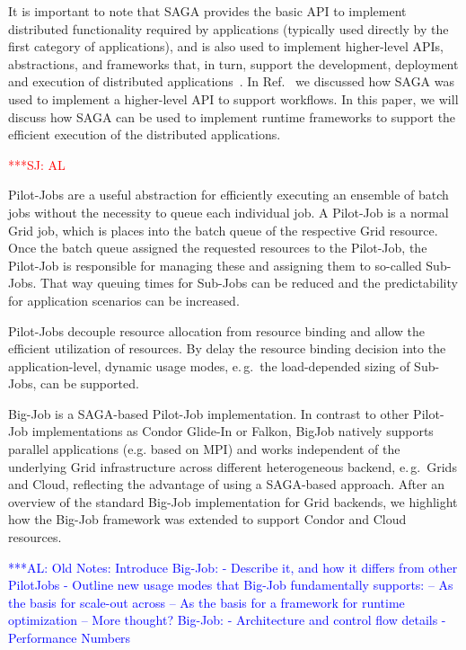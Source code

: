 \documentclass[conference,final]{IEEEtran}
\newcommand{\alnote}[1]{ {\textcolor{blue} { ***AL: #1 }}}
\newcommand{\jhanote}[1]{ {\textcolor{red} { ***SJ: #1 }}}
\newcommand{\alnote}[1]{}
\newcommand{\jhanote}[1]{}
\begin{document}
It is important to note that SAGA provides the basic API to
implement distributed functionality required by applications
(typically used directly by the first category of applications),
and is also used to implement higher-level APIs, abstractions, and
frameworks that, in turn, support the development, deployment and
execution of distributed
applications~\cite{gmac09,saga_data_intensive_abstractions}. In
Ref.~\cite{saga_montage} we discussed how SAGA was used to
implement a higher-level API to support workflows. In this paper, 
we will discuss how SAGA can be used to implement runtime
frameworks to support the efficient execution of the distributed
applications.


 \jhanote{AL}

Pilot-Jobs are a useful abstraction for efficiently executing an ensemble
of batch jobs without the necessity to queue each individual job. A Pilot-Job
is a normal Grid job, which is places into the batch queue of the respective 
Grid resource. Once the batch queue assigned the requested resources to the Pilot-Job,
the Pilot-Job is responsible for managing these and assigning them to so-called Sub-Jobs. 
That way queuing times for Sub-Jobs can be reduced and the predictability for application
scenarios can be increased. 

Pilot-Jobs decouple resource allocation from resource binding and
allow the efficient utilization of resources. By delay the resource
binding decision into the application-level, dynamic usage modes,
e.\,g.\ the load-depended sizing of Sub-Jobs, can be supported.

Big-Job is a SAGA-based Pilot-Job implementation. In contrast to other
Pilot-Job implementations as Condor Glide-In or Falkon, BigJob
natively supports parallel applications (e.g. based on MPI) and works
independent of the underlying Grid infrastructure across different
heterogeneous backend, e.\,g.\ Grids and Cloud, reflecting the
advantage of using a SAGA-based approach. After an overview of the
standard Big-Job implementation for Grid backends, we highlight how
the Big-Job framework was extended to support Condor and Cloud
resources.

\alnote{Old Notes: 
Introduce Big-Job:
 - Describe it, and how it differs from other PilotJobs
 - Outline new usage modes that Big-Job fundamentally supports:
    -- As the basis for scale-out across
    -- As the basis for a framework for runtime optimization
    -- More thought?
Big-Job:
 - Architecture and control flow details
 - Performance Numbers}
\end{document}
